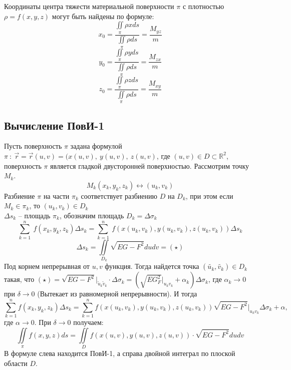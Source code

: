 \documentclass[../../main.tex]{subfiles}
\begin{document}
	Координаты центра тяжести материальной поверхности $\pi$ с плотностью $\rho =
	 f(x,y,z)$ могут быть найдены по формуле: 
	\[x_0 = \frac{\iint \limits_\pi \rho  x ds}{\iint \limits_\pi \rho ds} =
	 \frac{M_{yz}}{m}\]
	\[y_0 = \frac{\iint \limits_\pi \rho  y ds}{\iint \limits_\pi \rho ds} =
	 \frac{M_{zx}}{m}\]
	\[z_0 = \frac{\iint \limits_\pi \rho  z ds}{\iint \limits_\pi \rho ds} =
	 \frac{M_{xy}}{m}\]
    	\subsection{Вычисление ПовИ-1}
	Пусть поверхность $\pi$ задана формулой $\pi \ : \ \overrightarrow{r} =
	 \overrightarrow{r}(u, v) = (x(u,v), \ y(u,v), \ z(u, v)$, где $(u, v) \in D
	  \subset \mathds{R}^2$, поверхность $\pi$ является гладкой двусторонней
	   поверхностью. Рассмотрим точку $M_k$.
	\[M_k(x_k, y_k, z_k) \leftrightarrow (u_k, v_k)\]
	Разбиение $\pi$ на части $\pi_k$ соответствует разбиению $D$ на $D_k$, при 
	этом
	 если $M_k \in \pi_k$, то $(u_k, v_k) \in D_k$\\
	$\Delta s_k$ \--- площадь $\pi_k$, обозначим площадь $D_k  = \Delta\sigma 
	_k$\\
	\[\sum^{n}_{k=1} \ f(x_k, y_k, z_k)\Delta s_k = \sum^{n}_{k=1} \ f(x(u_k, 
	v_k),
	 y(u_k, v_k), z(u_k, v_k))\Delta s_k \]
	\[\Delta s_k = \iint \limits_{D_k}\sqrt{EG - F^2}dudv = (\star)  \]
	Под корнем непрерывная от $u, v$ функция. Тогда найдется точка $(\tilde{u_k},
	 \tilde{v_k}) \in D_k$ такая, что $(\star) = \sqrt{EG -F^2} \big|_{\tilde{u}_k
	  \tilde{v}_k} \cdot \Delta \sigma_k = (\sqrt{EG _F^2} \big|_{u_kv_k} 
	  +\alpha_k)
   \Delta \sigma_k$, где $\alpha_k \to 0$ при $\delta \to 0$ (Вытекает из 
   равномерной
    непрерывности). И тогда 
	\[ \sum_{k=1}^{n} f(x_k,y_k, z_k) \Delta s_k = \sum_{k=1}^{n} f(x(u_k, v_k),
	 y(u_k, v_k), z(u_k, v_k)) \sqrt{EG - F^2}\big|_{u_k v_k} \Delta \sigma_k
	  +\alpha,\]
	где $\alpha \to 0$. При $\delta \to 0$ получаем:
	\begin{equation}
	\label{lec23-1}
	\iint \limits_{\pi} f(x,y,z)ds = \iint \limits_Df(x(u,v), y(u,v),z(u,v)) 
	\cdot \sqrt{EG - F^2} du dv
	\end{equation}
    В формуле слева находится ПовИ-1, а справа двойной интеграл по плоской 
    области
     $D$.\\
\end{document}
